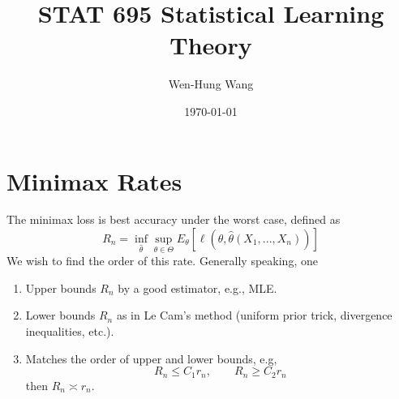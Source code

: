 \documentclass[11pt,twoside]{article}
\title{STAT 695 Statistical Learning Theory}
\author{Wen-Hung Wang}
\date{\today}
\begin{document}
\maketitle

\section{Minimax Rates}
The minimax loss is best accuracy under the worst case, defined as
    \[
    R_n = \inf_{\hat{\theta}} \sup_{\theta \in \Theta} E_{\theta}[\ell(\theta, \hat{\theta}(X_1,...,X_n))]
    \]
We wish to find the order of this rate. Generally speaking, one
\begin{enumerate}
    \item Upper bounds $R_n$ by a good estimator, e.g., MLE.
    \item Lower bounds $R_n$ as in Le Cam's method (uniform prior trick, divergence inequalities, etc.).
    \item Matches the order of upper and lower bounds, e.g,
    \[
    R_n \leq C_1 r_n, \qquad R_n \geq C_2 r_n
    \]
    then $R_n \asymp r_n$.
\end{enumerate}
\end{document}
